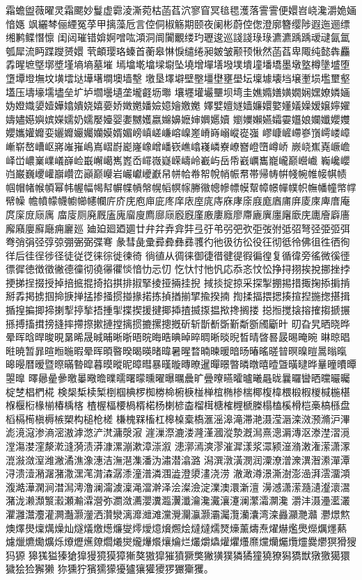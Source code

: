 \begin{appendices}
    霜蟾盥薇曜灵霜颸妙鬘虚霩淩澌菀枯菡萏泬寥窅冥毰毸濩落霅霅便嬛岧峣瀺灂姽婳愔嫕
    飒纚棽俪緸冤莩甲摛藻卮言倥侗椒觞期颐夜阑彬蔚倥偬澄廓簪缨陟遐迤逦缥缃鹣鲽憯懔
    闺闼璀错媕婀噌吰澒洞阛闠覼缕玓瓑逡巡諓諓琭琭瀌瀌踽踽叆叇氤氲瓠犀流眄蹀躞赟嬛
    茕頔璎珞螓首蘅皋惏悷缱绻昶皴皱颟顸愀然菡萏卑陬纯懿犇麤掱暒墌墍墎墏墐墒墒墓墔
    墕墖墘墖墚墛坠墝增墠墡墢墣墤墥墦墧墨墩墪樽墬墭堕墯墰墱墲坟墴墵垯墷墸墹墺墙墼
    墽垦墿壀壁壂壃壄壅壆坛壈壉壊垱壌壍埙壏壐壑壒压壔壕壖壗垒圹垆壛壜壝垄壠壡坜壣
    壤壥壦壧壨坝塆圭嫶嫷嫸嫹嫺娴嫼嫽嫾婳妫嬁嬂嬃嬄嬅嬆嬇娆嬉嬊娇嬍嬎嬏嬐嬑嬒嬓嬔
    嬕嬖嬗嬘嫱嬚嬛嬜嬞嬟嬠嫒嬢嬣嬥嬦嬧嬨嬩嫔嬫嬬奶嬬嬮嬯婴嬱嬲嬳嬴嬵嬶嬷婶嬹嬺嬻
    嬼嬽嬾嬿孀孁孂娘孄孅孆孇孆孈孉孊娈孋孊孍孎孏嫫婿媚嵭嵮嵯嵰嵱嵲嵳嵴嵵嵶嵷嵸嵹
    嵺嵻嵼嵽嵾嵿嶀嵝嶂嶃崭嶅嶆岖嶈嶉嶊嶋嶌嶍嶎嶏嶐嶑嶒嶓嵚嶕嶖嶘嶙嶚嶛嶜嶝嶞嶟峤
    嶡峣嶣嶤嶥嶦峄峃嶩嶪嶫嶬嶭崄嶯嶰嶱嶲嶳岙嶵嶶嶷嵘嶹岭嶻屿岳帋巀巁巂巃巄巅巆巇
    巈巉巊岿巌巍巎巏巐巑峦巓巅巕岩巗巘巙巚帠帡帢帣帤帨帩帪帬帯帰帱帲帴帵帷帹帺帻
    帼帽帾帿幁幂帏幄幅幆幇幈幉幊幋幌幍幎幏幐幑幒幓幖幙幚幛幜幝幞帜幠幡幢幤幥幦幧
    幨幩幪幭幮幯幰幱庍庎庑庖庘庛庝庠庡庢庣庤庥庨庩庪庬庮庯庰庱庲庳庴庵庹庺庻庼庽
    庿廀厕廃厩廅廆廇廋廌廍庼廏廐廑廒廔廕廖廗廘廙廛廜廞庑廤廥廦廧廨廭廮廯廰痈廲廵
    廸廹廻廼廽廿弁弅弆弇弉弖弙弚弜弝弞弡弢弣弤弨弩弪弫弬弭弮弰弲弪弴弶弸弻弼弽弿
    彖彗彘彚彛彜彝彞彟彴彵彶彷彸役彺彻彽彾佛徂徃徆徇徉后徍徎徏径徒従徔徕徖徙徚徛
    徜徝从徟徕御徢徣徤徥徦徧徨复循徫旁徭微徯徰徱徲徳徴徵徶德徸彻徺忁忂惔愔忇忈忉
    忔忕忖忚忛応忝忞忟忪挣挦挧挨挩挪挫挬挭挮挰掇授掉掊掋掍掎掐掑排掓掔掕挜掚挂掜
    掝掞掟掠采探掣掤掦措掫掬掭掮掯掰掱掲掳掴掵掶掸掹掺掻掼掽掾掿拣揁揂揃揅揄揆揇
    揈揉揊揋揌揍揎揑揓揔揕揖揗揘揙揤揥揦揧揨揫捂揰揱揲揳援揵揶揷揸揻揼揾揿搀搁搂
    搃搄搅搇搈搉搊搋搌搎搏搐搑搒摓摔摕摖摗摙摚摛掼摝摞摠摡斫斩斮斱斲斳斴斵斶斸旪
    旫旮旯晒晓晔晕晖晗晘晙晛晜晞晟晠晡晰晣晤晥晦晧晪晫晬晭晰晱晲晳晴晵晷晸晹晻晼
    晽晾晿暀暁暂暃暄暅暆暇晕晖暊暋暌暍暎暏暐暑暒暓暔暕暖暗旸暙暚暛暜暝暞暟暠暡暣
    暤暥暦暧暨暩暪暬暭暮暯暰昵暲暳暴暵暶暷暸暹暺暻暼暽暾暿曀曁曂曃晔曅曈曊曋曌曍
    曎曏曐曑曒曓曔曕曗曘曙曚曛曜曝曞曟旷曡曢曣曤曥曦曧昽曩曪曫晒曭曮曯椗椘椙椚椛
    検椝椞椟椠椡椢椣椤椥椦椧椨椩椪椫椬椭椮椯椰椱椲椳椴椵椶椷椸椹椺椻椼椽椾椿楀楁
    楂楃楅楆楇楈楉杨楋楌楍榴榵榶榷榸榹榺榻榼榽榾桤槀槁槂盘槄槅槆槇槈槉槊构槌枪槎
    槏槐槑槒杠槔槕槖槗滙滛滜滝滞滟滠滢滣滦滧滪滫沪滭滮滰滱渗滳滵滶滹滺浐滼滽漀漃
    漄漅漈漉溇漋漌漍漎漐漑澙熹漗漘漙沤漛漜漝漞漟漡漤漥漦漧漨漪渍漭漮漯漰漱漳漴溆
    漶漷漹漺漻漼漽漾浆潀颍潂潃潄潅潆潇潈潉潊潋潌潍潎潏潐潒潓洁潕潖潗潘沩潚潜潝潞
    潟潠潡潢潣润潥潦潧潨潩潪潫潬潭浔溃潱潲潳潴潵潶滗潸潹潺潻潼潽潾涠澁澄澃澅浇涝
    澈澉澊澋澌澍澎澏湃澐澑澒澓澔澕澖涧澘澙澚澛澜澝澞澟渑澢澣泽浍澯澰淀澲澳澴澵澶
    澷澸潇潆瀡瀢瀣瀤瀥潴泷濑瀩瀪瀫瀬瀭瀮瀯弥瀱潋瀳瀴瀵瀶瀷瀸瀹瀺瀻瀼瀽澜瀿灀灁瀺
    灂沣滠灅灆灇灈灉灊灋灌灍灎灏灐洒灒灓漓灖灗滩灙灚灛灜灏灞灟灠灡灢湾滦灥灦灧灨
    灪燝燞燠燡燢燣燤燥灿燧燨燩燪燫燮燯燰燱燲燳烩燵燵燸燹燺薰燽焘燿爀爁爂爃爄爅爇
    爈爉爊爋爌烁爎爏爑爒爓爔爕爖爗爘爙爚烂爜爝爞爟爠爡爢爣爤爥爦爧爨爩猽猾獀犸獂
    獆獇獈獉獊獋獌獍獏獐獑獒獓獔獕獖獗獘獙獚獛獜獝獞獟獠獡獢獣獤獥獦獧獩狯猃獬獭
    狝獯狞獱獳獴獶獹獽獾獿猡玁玂玃。

\end{appendices}